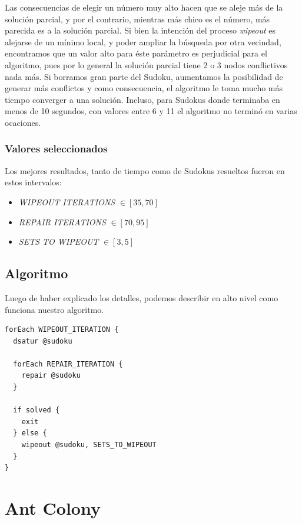 \documentclass[a4paper,spanish]{article}
\begin{document}
Las consecuencias de elegir un número muy alto hacen que se aleje más de la solución parcial,
y por el contrario, mientras más chico es el número, más parecida es a la solución parcial.
Si bien la intención del proceso \emph{wipeout} es alejarse de un mínimo local, y poder ampliar
la búsqueda por otra vecindad, encontramos que un valor alto para éste parámetro es perjudicial
para el algoritmo, pues por lo general la solución parcial tiene 2 o 3 nodos conflictivos nada más.
Si borramos gran parte del Sudoku, aumentamos la posibilidad de generar más conflictos y como
consecuencia, el algoritmo le toma mucho más tiempo converger a una solución. Incluso, para
Sudokus donde terminaba en menos de 10 segundos, con valores entre 6 y 11 el algoritmo no
terminó en varias ocaciones.

\subsubsection{Valores seleccionados}

Los mejores resultados, tanto de tiempo como de Sudokus resueltos fueron en estos intervalos:

\begin{itemize}
	\item \emph{WIPEOUT ITERATIONS} $\in [35, 70]$
	\item \emph{REPAIR ITERATIONS} $\in [70, 95]$
	\item \emph{SETS TO WIPEOUT} $\in [3, 5]$
\end{itemize}

\subsection{Algoritmo}

Luego de haber explicado los detalles, podemos describir en alto nivel como funciona nuestro
algoritmo.


\begin{verbatim}
forEach WIPEOUT_ITERATION {
  dsatur @sudoku
		
  forEach REPAIR_ITERATION {
    repair @sudoku  
  }

  if solved {
    exit
  } else {
    wipeout @sudoku, SETS_TO_WIPEOUT
  }
}
\end{verbatim}

\clearpage


\section{Ant Colony}
\end{document}
